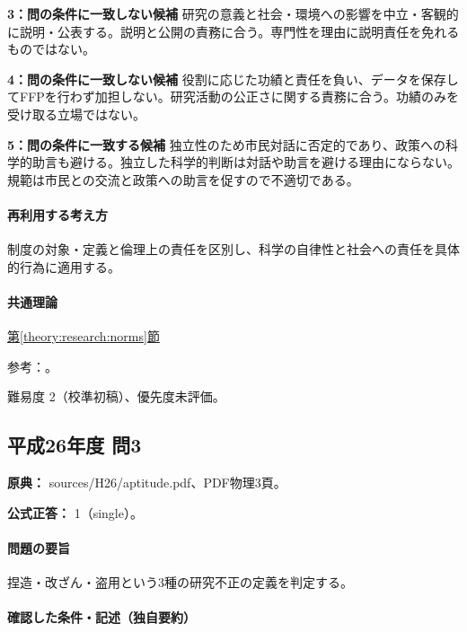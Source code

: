 \noindent\textbf{3：問の条件に一致しない候補} 研究の意義と社会・環境への影響を中立・客観的に説明・公表する。説明と公開の責務に合う。専門性を理由に説明責任を免れるものではない。\par

\noindent\textbf{4：問の条件に一致しない候補} 役割に応じた功績と責任を負い、データを保存してFFPを行わず加担しない。研究活動の公正さに関する責務に合う。功績のみを受け取る立場ではない。\par

\noindent\textbf{5：問の条件に一致する候補} 独立性のため市民対話に否定的であり、政策への科学的助言も避ける。独立した科学的判断は対話や助言を避ける理由にならない。規範は市民との交流と政策への助言を促すので不適切である。\par

\paragraph{再利用する考え方} 制度の対象・定義と倫理上の責任を区別し、科学の自律性と社会への責任を具体的行為に適用する。

\paragraph{共通理論} \hyperref[theory:research:norms]{第\ref*{theory:research:norms}節}

\par 参考：\cite{scj_code2013}。

\par 難易度 2（校準初稿）、優先度未評価。

\subsection{平成26年度 問3}
\label{q:h26-reg-apt-03}

\noindent\textbf{原典：} sources/H26/aptitude.pdf、PDF物理3頁。

\textbf{公式正答：} 1（single）。

\paragraph{問題の要旨} 捏造・改ざん・盗用という3種の研究不正の定義を判定する。

\paragraph{確認した条件・記述（独自要約）}\mbox{}\par

